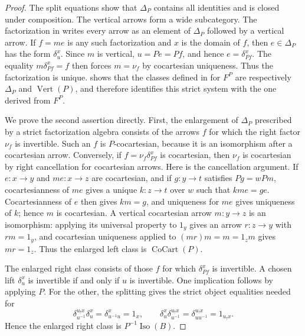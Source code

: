 \documentclass[11pt]{article}
\theoremstyle{plain}
\theoremstyle{definition}
\theoremstyle{remark}
\newcommand{\CoCart}{\operatorname{CoCart}}
\newcommand{\Vrt}{\operatorname{Vert}}
\newcommand{\Iso}{\operatorname{Iso}}
\numberwithin{equation}{section}
\begin{document}
\begin{proof}
The split equations show that $\Delta_P$ contains all identities and
is closed under composition.  The vertical arrows form a wide
subcategory.  The factorization in  writes every
arrow as an element of $\Delta_P$ followed by a vertical arrow.  If
$f=me$ is any such factorization and $x$ is the domain of $f$, then
$e\in\Delta_P$ has the form $\delta^{x}_{u}$.  Since $m$ is vertical,
$u=Pe=Pf$, and hence $e=\delta^{x}_{Pf}$.  The equality
$m\delta^{x}_{Pf}=f$ then forces $m=\nu_f$ by cocartesian uniqueness.
Thus the factorization is unique.   shows that the
classes defined in  for $F^{P}$ are respectively $\Delta_P$ and
$\Vrt(P)$, and therefore identifies this strict system with the one
derived from $F^{P}$.

We prove the second assertion directly.  First, the enlargement of
$\Delta_P$ prescribed by a strict factorization algebra consists of
the arrows $f$ for which the right factor $\nu_f$ is invertible.  Such
an $f$ is $P$-cocartesian, because it is an isomorphism after a
cocartesian arrow.  Conversely, if $f=\nu_f\delta^{x}_{Pf}$ is
cocartesian, then $\nu_f$ is cocartesian by right cancellation for
cocartesian arrows.  Here is the cancellation argument.  If
$e\colon x\to y$ and $me\colon x\to z$ are cocartesian, and if
$g\colon y\to t$ satisfies $Pg=wPm$, cocartesianness of $me$ gives a
unique $k\colon z\to t$ over $w$ such that $kme=ge$.
Cocartesianness of $e$ then gives $km=g$, and uniqueness for $me$
gives uniqueness of $k$; hence $m$ is cocartesian.  A vertical
cocartesian arrow $m\colon y\to z$ is an isomorphism: applying its
universal property to $1_y$ gives an arrow $r\colon z\to y$ with
$rm=1_y$, and cocartesian uniqueness applied to
$(mr)m=m=1_zm$ gives $mr=1_z$.  Thus the enlarged left class is
$\CoCart(P)$.

The enlarged right class consists of those $f$ for which
$\delta^{x}_{Pf}$ is invertible.  A chosen lift $\delta^{x}_{u}$ is
invertible if and only if $u$ is invertible.  One implication follows
by applying $P$.  For the other, the splitting gives the strict object
equalities needed for
\begin{equation*}
  \delta^{u_{!}x}_{u^{-1}}\delta^{x}_{u}
    =\delta^{x}_{u^{-1}u}=1_x,
  \qquad
  \delta^{x}_{u}\delta^{u_{!}x}_{u^{-1}}
    =\delta^{u_{!}x}_{uu^{-1}}=1_{u_{!}x}.
\end{equation*}
Hence the enlarged right class is $P^{-1}\Iso(B)$.


\end{proof}
\end{document}
